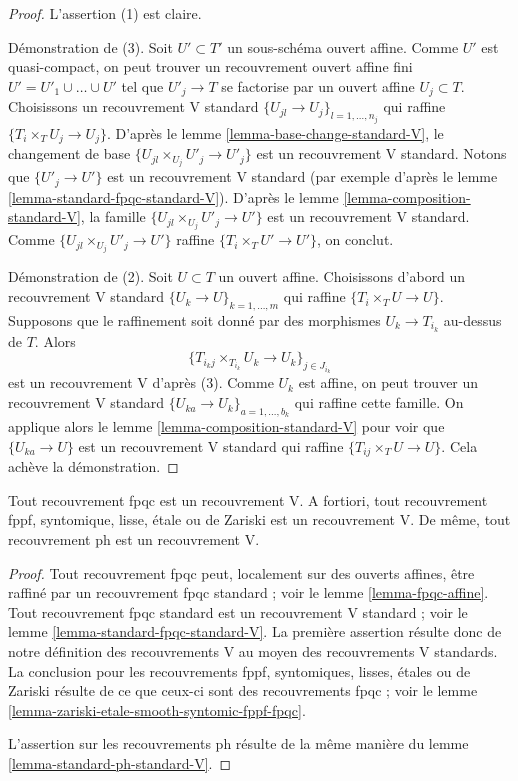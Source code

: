 \begin{proof}
L'assertion (1) est claire.

\medskip\noindent
Démonstration de (3).
Soit $U' \subset T'$ un sous-schéma ouvert affine.
Comme $U'$ est quasi-compact, on peut trouver un recouvrement ouvert affine
fini $U' = U'_1 \cup \ldots \cup U'$ tel que
$U'_j \to T$ se factorise par un ouvert affine $U_j \subset T$.
Choisissons un recouvrement V standard $\{U_{jl} \to U_j\}_{l = 1, \ldots, n_j}$
qui raffine $\{T_i \times_T U_j \to U_j\}$.
D'après le lemme \ref{lemma-base-change-standard-V},
le changement de base $\{U_{jl} \times_{U_j} U'_j \to U'_j\}$
est un recouvrement V standard. Notons que $\{U'_j \to U'\}$
est un recouvrement V standard
(par exemple d'après le lemme \ref{lemma-standard-fpqc-standard-V}).
D'après le lemme \ref{lemma-composition-standard-V}, 
la famille $\{U_{jl} \times_{U_j} U'_j \to U'\}$
est un recouvrement V standard. Comme
$\{U_{jl} \times_{U_j} U'_j \to U'\}$ raffine $\{T_i \times_T U' \to U'\}$,
on conclut.

\medskip\noindent
Démonstration de (2).
Soit $U \subset T$ un ouvert affine. Choisissons d'abord un recouvrement V standard
$\{U_k \to U\}_{k = 1, \ldots, m}$ qui raffine
$\{T_i \times_T U \to U\}$.
Supposons que le raffinement soit donné par des morphismes $U_k \to T_{i_k}$ au-dessus de $T$.
Alors
$$
\{T_{i_kj} \times_{T_{i_k}} U_k \to U_k\}_{j \in J_{i_k}}
$$
est un recouvrement V d'après (3). Comme $U_k$ est affine,
on peut trouver un recouvrement V standard
$\{U_{ka} \to U_k\}_{a = 1, \ldots, b_k}$ qui raffine cette famille.
On applique alors le lemme \ref{lemma-composition-standard-V}
pour voir que $\{U_{ka} \to U\}$ est un recouvrement V standard qui
raffine $\{T_{ij} \times_T U \to U\}$. Cela achève la démonstration.
\end{proof}

\begin{lemma}
\label{lemma-zariski-etale-smooth-syntomic-fppf-fpqc-ph-V}
Tout recouvrement fpqc est un recouvrement V. A fortiori,
tout recouvrement fppf, syntomique, lisse, étale ou de Zariski est un recouvrement V.
De même, tout recouvrement ph est un recouvrement V.
\end{lemma}

\begin{proof}
Tout recouvrement fpqc peut, localement sur des ouverts affines, être raffiné par un
recouvrement fpqc standard ; voir le lemme \ref{lemma-fpqc-affine}.
Tout recouvrement fpqc standard est un recouvrement V standard ; voir le
lemme \ref{lemma-standard-fpqc-standard-V}. La première assertion résulte donc
de notre définition des recouvrements V au moyen des recouvrements V standards.
La conclusion pour les recouvrements fppf, syntomiques, lisses, étales ou de Zariski
résulte de ce que ceux-ci sont des recouvrements fpqc ; voir le
lemme \ref{lemma-zariski-etale-smooth-syntomic-fppf-fpqc}.

\medskip\noindent
L'assertion sur les recouvrements ph résulte de la même manière du
lemme \ref{lemma-standard-ph-standard-V}.
\end{proof}

